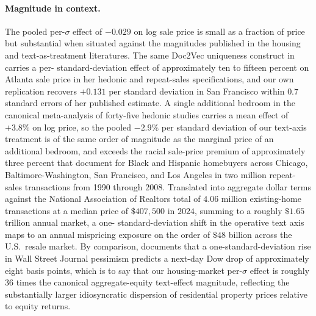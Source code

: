 \paragraph{Magnitude in context.} The pooled per-$\sigma$ effect of
$-0.029$ on log sale price is small as a fraction of price but
substantial when situated against the magnitudes published in the
housing and text-as-treatment literatures.  The same Doc2Vec
uniqueness construct in \citet{shen2021information} carries a per-
standard-deviation effect of approximately ten to fifteen percent on
Atlanta sale price in her hedonic and repeat-sales specifications,
and our own replication recovers $+0.131$ per standard deviation in
San Francisco within $0.7$ standard errors of her published estimate.
A single additional bedroom in the canonical
\citet{sirmans2005composition} meta-analysis of forty-five hedonic
studies carries a mean effect of $+3.8\%$ on log price, so the pooled
$-2.9\%$ per standard deviation of our text-axis treatment is of the
same order of magnitude as the marginal price of an additional
bedroom, and exceeds the racial sale-price premium of approximately
three percent that \citet{bayer2017racial} document for Black and
Hispanic homebuyers across Chicago, Baltimore-Washington, San
Francisco, and Los Angeles in two million repeat-sales transactions
from 1990 through 2008.  Translated into aggregate dollar terms
against the National Association of Realtors total of $4.06$ million
existing-home transactions at a median price of $\$407{,}500$ in
$2024$, summing to a roughly $\$1.65$ trillion annual market, a one-
standard-deviation shift in the operative text axis maps to an annual
mispricing exposure on the order of $\$48$ billion across the U.S.\
resale market.  By comparison, \citet{tetlock2007giving} documents
that a one-standard-deviation rise in Wall Street Journal pessimism
predicts a next-day Dow drop of approximately eight basis points,
which is to say that our housing-market per-$\sigma$ effect is
roughly $36$ times the canonical aggregate-equity text-effect
magnitude, reflecting the substantially larger idiosyncratic
dispersion of residential property prices relative to equity
returns.

